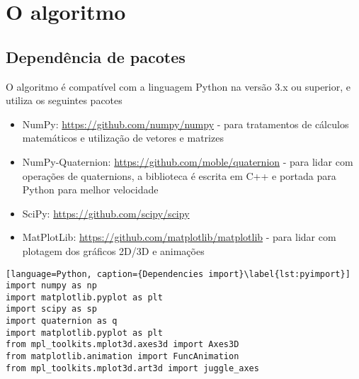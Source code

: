 %
\chapter{O algoritmo}
\label{sec:algoritmo}
\section{Dependência de pacotes}
O algoritmo é compatível com a linguagem Python na versão 3.x ou superior, e utiliza os seguintes pacotes
\begin{itemize}
\item NumPy:  \url{https://github.com/numpy/numpy} - para tratamentos de cálculos matemáticos e utilização de vetores e matrizes
\item NumPy-Quaternion: \url{https://github.com/moble/quaternion} - para lidar com operações de quaternions, a biblioteca é escrita em C++ e portada para Python para melhor velocidade
\item SciPy: \url{https://github.com/scipy/scipy}
\item MatPlotLib: \url{https://github.com/matplotlib/matplotlib} - para lidar com plotagem dos gráficos 2D/3D e animações
\end{itemize}

\begin{lstlisting}[language=Python, caption={Dependencies import}\label{lst:pyimport}]
import numpy as np
import matplotlib.pyplot as plt
import scipy as sp
import quaternion as q
import matplotlib.pyplot as plt
from mpl_toolkits.mplot3d.axes3d import Axes3D
from matplotlib.animation import FuncAnimation
from mpl_toolkits.mplot3d.art3d import juggle_axes
\end{lstlisting}